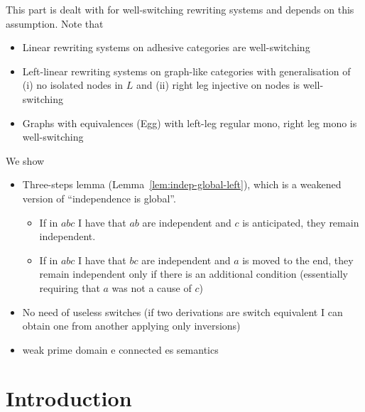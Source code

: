 \documentclass[a4paper,UKenglish,cleveref,pdftex,thm-restate,numberwithinsect]{lipics-v2021}
\begin{document}
This part is dealt with for well-switching rewriting systems and depends on this assumption. Note that
\begin{itemize}
\item Linear rewriting systems on adhesive categories are well-switching
\item Left-linear rewriting systems on graph-like categories with generalisation of (i) no isolated nodes in $L$ and (ii) right leg injective on nodes is well-switching
\item Graphs with equivalences (Egg) with left-leg regular mono, right leg mono is well-switching
\end{itemize}

We show
\begin{itemize}
  

\item Three-steps lemma (Lemma~\ref{lem:indep-global-left}), which is a weakened version of ``independence is global''.
  \begin{itemize}
    
  \item If in $abc$ I have that $ab$ are independent and $c$ is anticipated, they remain independent.
  \item  If in $abc$ I have that $bc$ are independent and $a$ is moved to the end, they remain independent only if there is an additional condition (essentially requiring that $a$ was not a cause of $c$)
  \end{itemize}

  
  
\item No need of useless switches (if two derivations are switch equivalent I can obtain one from another applying only inversions)
  
\item weak prime domain e connected es semantics
\end{itemize}
\fi

\section{Introduction}

%
\end{document}
